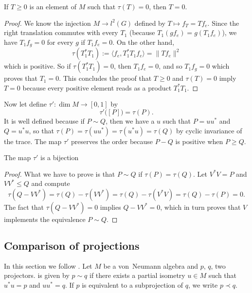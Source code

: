 \begin{proposition}
If $T\geq 0$ is an element of $M$ such that $\tau(T)=0$, then $T=0$.
\end{proposition}

\begin{proof}
We know the injection $M\to l^2(G)$ defined by $T\mapsto f_T=Tf_e$. Since the right translation commutes with every $T_1$ (because $T_1(gf_e)=g(T_1f_e)$), we have $T_1f_g=0$ for every $g$ if $T_1f_e=0$. On the other hand,
\[ 
  \tau(T_1^*T_1):=\langle f_e, T_1^*T_1f_e\rangle =\| Tf_e \|^2
\]
which is positive. So if $\tau(T_1^*T_1)=0$, then $T_1f_e=0$, and so $T_1f_g=0$ which proves that $T_1=0$. This concludes the proof that $T\geq 0$ and $\tau(T)=0$ imply $T=0$ because every positive element reads as a product $T_1^*T_1$. 
\end{proof}

Now let define $\tau'\colon \dim M\to [0,1]$ by
\begin{equation}
	\tau'\big( [P] \big)=\tau(P).
\end{equation}
It is well defined because if $P\sim Q$, then we have a $u$ such that $P=uu^*$ and $Q=u^*u$, so that $\tau(P)=\tau(uu^*)=\tau(u^*u)=\tau(Q)$ by cyclic invariance of the trace. The map $\tau'$ preserves the order because $P-Q$ is positive when $P\geq Q$.

\begin{proposition}
The map $\tau'$ is a bijection
\end{proposition}

\begin{proof}
What we have to prove is that $P\sim Q$ if $\tau(P)=\tau(Q)$. Let $V^*V=P$ and $VV^*\leq Q$ and compute
\[ 
  \tau(Q-VV^*)=\tau(Q)-\tau(VV^*)=\tau(Q)-\tau(V^*V)=\tau(Q)-\tau(P)=0.
\]
The fact that $\tau(Q-VV^*)=0$ implies $Q-VV^*=0$, which in turn proves that $V$ implements the equivalence $P\sim Q$.
\end{proof}

					\subsection{Comparison of projections}

In this section we follow \cite{Wassermann}. Let $M$ be a von~Neumann algebra and $p$, $q$, two projectors. \label{PgEaivVNMurray}  is given by $p\sim q$ if there exists a partial isometry $u\in M$ such that $u^*u=p$ and $uu^*=q$. If $p$ is equivalent to a subprojection of $q$, we write $p\prec q$.


